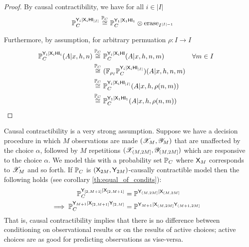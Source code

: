 \begin{proof}
By causal contractibility, we have for all $i\in |I|$
\begin{align}
    \mathbb{P}_C^{\mathsf{Y}_i|\mathsf{X}_i\mathsf{H}\mathsf{I}_{|I|}} &\overset{\mathbb{P}_C}{\cong} \mathbb{P}_C^{\mathsf{Y}_1|\mathsf{X}_1\mathsf{H}\mathsf{I}_1}\otimes \text{erase}_{I^{|I|-1}}
\end{align}

Furthermore, by assumption, for arbitrary permuation $\rho:I\to I$
\begin{align}
    \mathbb{P}_C^{\mathsf{Y}_i|\mathsf{X}_i\mathsf{H}\mathsf{I}_i}(A|x,h,n) &\overset{\mathbb{P}_C}{\cong} \mathbb{P}_C^{\mathsf{Y}_i|\mathsf{X}_i\mathsf{H}\mathsf{I}}(A|x,h,n,m) & \forall m\in I\\
     &\overset{\mathbb{P}_C}{\cong} (\mathbb{F}_{\rho_I}\mathbb{P}_C^{\mathsf{Y}_i|\mathsf{X}_i\mathsf{H}\mathsf{I}_{|I|}})(A|x,h,n,m)\\
    &\overset{\mathbb{P}_C}{\cong} \mathbb{P}_C^{\mathsf{Y}_i|\mathsf{X}_i\mathsf{H}\mathsf{I}_{|I|}}(A|x,h,\rho(n,m))\\
    &\overset{\mathbb{P}_C}{\cong} \mathbb{P}_C^{\mathsf{Y}_1|\mathsf{X}_1\mathsf{H}\mathsf{I}_1}(A|x,h,\rho(n,m))
\end{align}
\end{proof}

\begin{theorem}\label{th:cc_mut_exc}

\end{theorem}

Causal contractibility is a very strong assumption. Suppose we have a decision procedure in which $M$ observations are made $(\mathscr{X}_M,\mathscr{Y}_M)$ that are unaffected by the choice $\alpha$, followed by $M$ repetitions $(\mathscr{X}_{(M,2M]},\mathscr{Y}_{(M,2M]})$ which are responsive to the choice $\alpha$. We model this with a probability set $\mathbb{P}_C$ where $\mathsf{X}_M$ corresponds to $\mathscr{X}_M$ and so forth. If $\mathbb{P}_C$ is $(\mathsf{X}_{2M},\mathsf{Y}_{2M})$-causally contractible model then the following holds (see corollary \ref{th:equal_of_condits}):
\begin{align}
    \mathbb{P}^{\mathsf{Y}_{[2,M+1]}|\mathsf{X}_{[2,M+1]}}_C &= \mathbb{P}^{\mathsf{Y}_{(M,2M]}|\mathsf{X}_{(M,2M]}}\\
    \implies \mathbb{P}^{\mathsf{Y}_{M+1}|\mathsf{X}_{[2,M+1]}\mathsf{Y}_{[2,M]}}_C &= \mathbb{P}^{\mathsf{Y}_{M+1}|\mathsf{X}_{(M,2M]}\mathsf{Y}_{(M+1,2M]}}
\end{align}
That is, causal contractibility implies that there is no difference between conditioning on observational results or on the results of active choices; active choices are as good for predicting observations as vise-versa.

